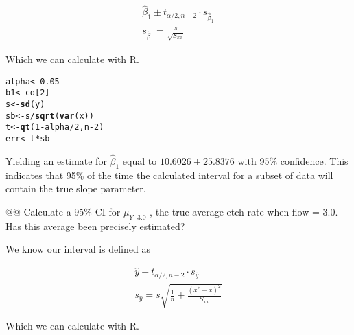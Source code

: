 \documentclass[10pt]{article}\usepackage[]{graphicx}\usepackage[]{xcolor}
\makeatletter
\newcommand{\hlnum}[1]{\textcolor[rgb]{0.686,0.059,0.569}{#1}}%
\newcommand{\hlopt}[1]{\textcolor[rgb]{0,0,0}{#1}}%
\newcommand{\hlstd}[1]{\textcolor[rgb]{0.345,0.345,0.345}{#1}}%
\newcommand{\hlkwb}[1]{\textcolor[rgb]{0.69,0.353,0.396}{#1}}%
\newcommand{\hlkwd}[1]{\textcolor[rgb]{0.737,0.353,0.396}{\textbf{#1}}}%
\newenvironment{kframe}{%
 \def\at@end@of@kframe{}%
 \ifinner\ifhmode%
  \def\at@end@of@kframe{\end{minipage}}%
  \begin{minipage}{\columnwidth}%
 \fi\fi%
 \def\FrameCommand##1{\hskip\@totalleftmargin \hskip-\fboxsep
 \colorbox{shadecolor}{##1}\hskip-\fboxsep
     \hskip-\linewidth \hskip-\@totalleftmargin \hskip\columnwidth}%
 \MakeFramed {\advance\hsize-\width
   \@totalleftmargin\z@ \linewidth\hsize
   \@setminipage}}%
 {\par\unskip\endMakeFramed%
 \at@end@of@kframe}
\newenvironment{knitrout}{}{} %
\makeatother
\begin{document}
\begin{easylist}[enumerate]
    \begin{equation}
        \begin{aligned}
            \hat{\beta}_1 \pm t_{\alpha / 2, n - 2} \cdot s_{\hat{\beta}_1}\\
            s_{\hat{\beta}_1} = \frac{s}{\sqrt{S_{xx}}}
        \end{aligned}
    \end{equation}

    Which we can calculate with R.

\begin{knitrout}
\color{fgcolor}\begin{kframe}
\begin{alltt}
         \hlstd{alpha} \hlkwb{<-} \hlnum{0.05}
         \hlstd{b1} \hlkwb{<-} \hlstd{co[}\hlnum{2}\hlstd{]}
         \hlstd{s} \hlkwb{<-} \hlkwd{sd}\hlstd{(y)}
         \hlstd{sb} \hlkwb{<-} \hlstd{s} \hlopt{/} \hlkwd{sqrt}\hlstd{(}\hlkwd{var}\hlstd{(x))}
         \hlstd{t} \hlkwb{<-} \hlkwd{qt}\hlstd{(}\hlnum{1} \hlopt{-} \hlstd{alpha} \hlopt{/} \hlnum{2}\hlstd{, n} \hlopt{-} \hlnum{2}\hlstd{)}
         \hlstd{err} \hlkwb{<-} \hlstd{t} \hlopt{*} \hlstd{sb}
\end{alltt}
\end{kframe}
\end{knitrout}


    Yielding an estimate for $\hat{\beta}_1$ equal to $10.6026 \pm 25.8376$ with 95\% confidence. This indicates
    that 95\% of the time the calculated interval for a subset of data will contain the true slope parameter.

    @@ Calculate a 95\% CI for $\mu_{Y \cdot 3.0}$ , the true average etch rate when flow = 3.0. Has this average been
    precisely estimated?\newline

    We know our interval is defined as

    \begin{equation}
        \begin{aligned}
            \hat{y} \pm t_{\alpha / 2, n - 2} \cdot s_{\hat{y}}\\
            s_{\hat{y}} = s \sqrt{\frac{1}{n} + \frac{{\left( x^* - \overline{x} \right)}^2}{S_{xx}}}
        \end{aligned}
    \end{equation}

    Which we can calculate with R.


\end{easylist}
\end{document}
